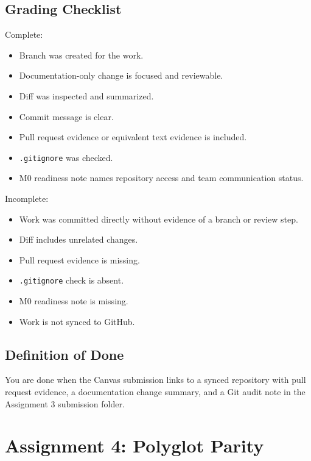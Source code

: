 \documentclass[
  letterpaper,
  DIV=11,
  numbers=noendperiod,
  oneside]{scrreprt}
\providecommand{\tightlist}{%
  \setlength{\itemsep}{0pt}\setlength{\parskip}{0pt}}
\begin{document}
\section{Grading Checklist}\label{grading-checklist-2}

Complete:

\begin{itemize}
\tightlist
\item
  Branch was created for the work.
\item
  Documentation-only change is focused and reviewable.
\item
  Diff was inspected and summarized.
\item
  Commit message is clear.
\item
  Pull request evidence or equivalent text evidence is included.
\item
  \texttt{.gitignore} was checked.
\item
  M0 readiness note names repository access and team communication
  status.
\end{itemize}

Incomplete:

\begin{itemize}
\tightlist
\item
  Work was committed directly without evidence of a branch or review
  step.
\item
  Diff includes unrelated changes.
\item
  Pull request evidence is missing.
\item
  \texttt{.gitignore} check is absent.
\item
  M0 readiness note is missing.
\item
  Work is not synced to GitHub.
\end{itemize}

\section{Definition of Done}\label{definition-of-done-12}

You are done when the Canvas submission links to a synced repository
with pull request evidence, a documentation change summary, and a Git
audit note in the Assignment 3 submission folder.

\chapter{Assignment 4: Polyglot
Parity}\label{assignment-4-polyglot-parity}
\end{document}
